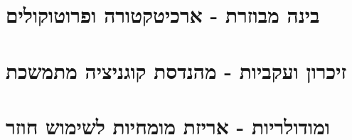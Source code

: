 \documentclass{hebrew-academic-template}
\begin{document}
\tableofcontents

\part{בינה מבוזרת - ארכיטקטורה ופרוטוקולים}








\part{זיכרון ועקביות - מהנדסת קוגניציה מתמשכת}









\part{ ומודולריות - אריזת מומחיות לשימוש חוזר}





\clearpage







\clearpage
\printenglishbibliography
\end{document}
